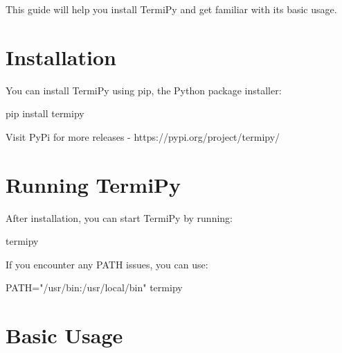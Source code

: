 \documentclass[
  letterpaper,
  DIV=11,
  numbers=noendperiod]{scrreprt}
\newenvironment{Shaded}{\begin{snugshade}}{\end{snugshade}}
\newcommand{\ExtensionTok}[1]{\textcolor[rgb]{0.00,0.23,0.31}{#1}}
\newcommand{\NormalTok}[1]{\textcolor[rgb]{0.00,0.23,0.31}{#1}}
\newcommand{\OperatorTok}[1]{\textcolor[rgb]{0.37,0.37,0.37}{#1}}
\newcommand{\StringTok}[1]{\textcolor[rgb]{0.13,0.47,0.30}{#1}}
\newcommand{\VariableTok}[1]{\textcolor[rgb]{0.07,0.07,0.07}{#1}}
\begin{document}

This guide will help you install TermiPy and get familiar with its basic
usage.

\section*{Installation}\label{installation}


You can install TermiPy using pip, the Python package installer:

\begin{Shaded}
\begin{Highlighting}[]
\ExtensionTok{pip}\NormalTok{ install termipy}
\end{Highlighting}
\end{Shaded}

Visit PyPi for more releases - https://pypi.org/project/termipy/

\section*{Running TermiPy}\label{running-termipy}


After installation, you can start TermiPy by running:

\begin{Shaded}
\begin{Highlighting}[]
\ExtensionTok{termipy}
\end{Highlighting}
\end{Shaded}

If you encounter any PATH issues, you can use:

\begin{Shaded}
\begin{Highlighting}[]
\VariableTok{PATH}\OperatorTok{=}\StringTok{"/usr/bin:/usr/local/bin"} \ExtensionTok{termipy}
\end{Highlighting}
\end{Shaded}

\section*{Basic Usage}\label{basic-usage}

\end{document}
